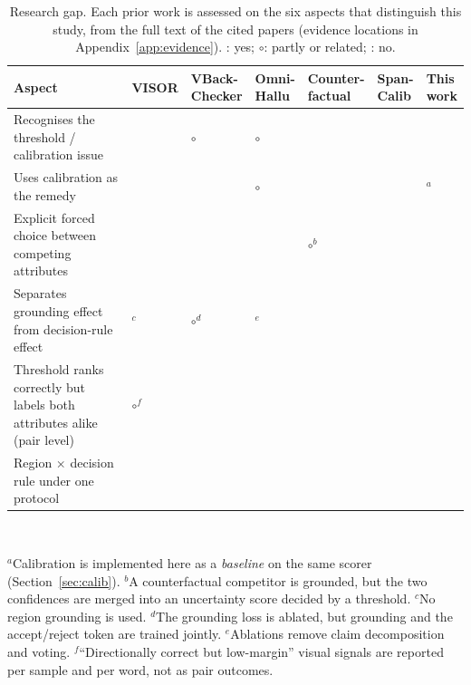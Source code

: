 \documentclass[11pt]{article}
\newcommand{\cmark}{\ding{51}}
\newcommand{\xmark}{\ding{55}}
\newcommand{\pmark}{$\circ$}
\begin{document}
\begin{table}[!htbp]
\centering
\caption{Research gap. Each prior work is assessed on the six aspects that distinguish this study, from the full text of the cited papers (evidence locations in Appendix~\ref{app:evidence}). \cmark: yes; \pmark: partly or related; \xmark: no.}
\label{tab:gap}
\small
\begin{tabularx}{\textwidth}{>{\raggedright\arraybackslash}p{4.3cm}*{6}{>{\centering\arraybackslash}X}}
\toprule
Aspect & \makecell{VISOR\\\cite{zhang2026visor}} & \makecell{VBack-\\Checker\\\cite{guo2026vbackchecker}} & \makecell{Omni-\\Hallu\\\cite{yang2026omnihallu}} & \makecell{Counter-\\factual\\\cite{song2026countervhd}} & \makecell{Span-\\Calib\\\cite{abebe2026spancalib}} & \makecell{\textbf{This}\\\textbf{work}} \\
\midrule
Recognises the threshold / calibration issue & \cmark & \pmark & \pmark & \cmark & \cmark & \cmark \\
Uses calibration as the remedy & \cmark & \xmark & \pmark & \xmark & \cmark & \xmark$^{a}$ \\
Explicit forced choice between competing attributes & \xmark & \xmark & \xmark & \pmark$^{b}$ & \xmark & \cmark \\
Separates grounding effect from decision-rule effect & \xmark$^{c}$ & \pmark$^{d}$ & \xmark$^{e}$ & \xmark & \xmark & \cmark \\
Threshold ranks correctly but labels both attributes alike (pair level) & \pmark$^{f}$ & \xmark & \xmark & \xmark & \xmark & \cmark \\
Region $\times$ decision rule under one protocol & \xmark & \xmark & \xmark & \xmark & \xmark & \cmark \\
\bottomrule
\end{tabularx}\\[3pt]
\parbox{\textwidth}{\footnotesize $^{a}$Calibration is implemented here as a \emph{baseline} on the same scorer (Section~\ref{sec:calib}). $^{b}$A counterfactual competitor is grounded, but the two confidences are merged into an uncertainty score decided by a threshold. $^{c}$No region grounding is used. $^{d}$The grounding loss is ablated, but grounding and the accept/reject token are trained jointly. $^{e}$Ablations remove claim decomposition and voting. $^{f}$``Directionally correct but low-margin'' visual signals are reported per sample and per word, not as pair outcomes.}
\end{table}
\end{document}
